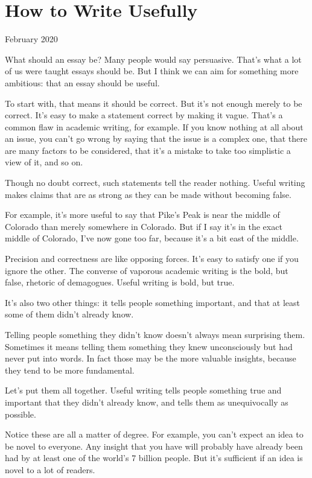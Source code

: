 \chapter{How to Write Usefully}

February 2020

What should an essay be? Many people would say persuasive. That's what a
lot of us were taught essays should be. But I think we can aim for
something more ambitious: that an essay should be useful.

To start with, that means it should be correct. But it's not enough
merely to be correct. It's easy to make a statement correct by making it
vague. That's a common flaw in academic writing, for example. If you
know nothing at all about an issue, you can't go wrong by saying that
the issue is a complex one, that there are many factors to be
considered, that it's a mistake to take too simplistic a view of it, and
so on.

Though no doubt correct, such statements tell the reader nothing. Useful
writing makes claims that are as strong as they can be made without
becoming false.

For example, it's more useful to say that Pike's Peak is near the middle
of Colorado than merely somewhere in Colorado. But if I say it's in the
exact middle of Colorado, I've now gone too far, because it's a bit east
of the middle.

Precision and correctness are like opposing forces. It's easy to satisfy
one if you ignore the other. The converse of vaporous academic writing
is the bold, but false, rhetoric of demagogues. Useful writing is bold,
but true.

It's also two other things: it tells people something important, and
that at least some of them didn't already know.

Telling people something they didn't know doesn't always mean surprising
them. Sometimes it means telling them something they knew unconsciously
but had never put into words. In fact those may be the more valuable
insights, because they tend to be more fundamental.

Let's put them all together. Useful writing tells people something true
and important that they didn't already know, and tells them as
unequivocally as possible.

Notice these are all a matter of degree. For example, you can't expect
an idea to be novel to everyone. Any insight that you have will probably
have already been had by at least one of the world's 7 billion people.
But it's sufficient if an idea is novel to a lot of readers.

